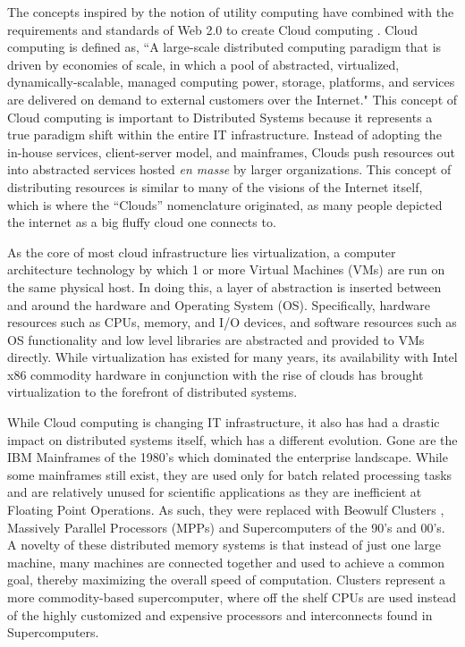 The concepts inspired by the notion of utility computing have combined with the requirements and standards of Web 2.0 \cite{alexander2006wnw} to create Cloud computing \cite{buyya2008moc, foster2008cca, aboveTheClouds}.  Cloud computing is defined as, ``A large-scale distributed computing paradigm that is driven by economies of scale, in which a pool of abstracted, virtualized, dynamically-scalable, managed computing power, storage, platforms, and services are delivered on demand to external customers over the Internet." This concept of Cloud computing is important to Distributed Systems because it represents a true paradigm shift \cite{kuhn1970structure} within the entire IT infrastructure.  Instead of adopting the in-house services, client-server model, and mainframes, Clouds push resources out into abstracted services hosted \textit{en masse} by larger organizations.  This concept of distributing resources is similar to many of the visions of the Internet itself, which is where the ``Clouds'' nomenclature originated, as many people depicted the internet as a big fluffy cloud one connects to.

As the core of most cloud infrastructure lies virtualization, a computer architecture technology by which 1 or more Virtual Machines (VMs) are run on the same physical host. In doing this, a layer of abstraction is inserted between and around the hardware and Operating System (OS). Specifically, hardware resources such as CPUs, memory, and I/O devices, and software resources such as OS functionality and low level libraries are abstracted and provided to VMs directly. While virtualization has existed for many years,  its availability with Intel x86 commodity hardware in conjunction with the rise of clouds has brought virtualization to the forefront of distributed systems. 

While Cloud computing is changing IT infrastructure, it also has had a drastic impact on distributed systems itself, which has a different evolution. Gone are the IBM Mainframes of the 1980's which dominated the enterprise landscape.  While some mainframes still exist, they are used only for batch related processing tasks and are relatively unused for scientific applications as they are inefficient at Floating Point Operations.  As such, they were replaced with Beowulf Clusters \cite{sterling2001beowulf}, Massively Parallel Processors (MPPs) and Supercomputers of the 90's and 00's. A novelty of these distributed memory systems is that instead of just one large machine, many machines are connected together and used to achieve a common goal, thereby maximizing the overall speed of computation.  Clusters represent a more commodity-based supercomputer, where off the shelf CPUs are used instead of the highly customized and expensive processors and interconnects found in Supercomputers.  

